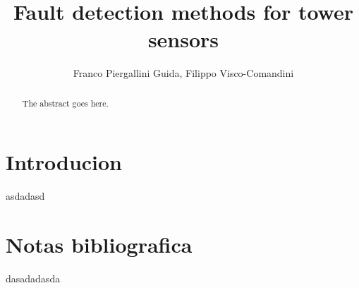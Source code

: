 \documentclass[journal]{IEEEtran}
\begin{document}
\title{Fault detection methods for tower sensors}

\author{Franco Piergallini Guida, Filippo Visco-Comandini}%



\maketitle

\begin{abstract}
The abstract goes here.
\end{abstract}
\section{Introducion}
asdadasd


\section{Notas bibliografica}
dasadadasda
\cite{wang2014scada}

\cite{kusiak2011prediction}

\cite{lu2009review}

\cite{schlechtingen2012condition}

\cite{schlechtingen2011comparative}

\cite{yang2014wind}

\cite{tchakoua2014wind}


\cite{wymore2015survey}


\cite{kim2011use}


\end{document}
